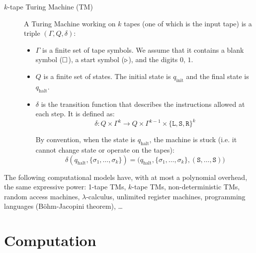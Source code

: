 \begin{description}
    \item[$k$-tape Turing Machine (TM)] 
        A Turing Machine working on $k$ tapes (one of which is the input tape) is a triple $(\Gamma, Q, \delta)$:
        \begin{itemize}
            \item $\Gamma$ is a finite set of tape symbols.
                We assume that it contains a blank symbol ($\square$), a start symbol ($\triangleright$),
                and the digits $0$, $1$.
            
            \item $Q$ is a finite set of states.
                The initial state is $q_\text{init}$ and the final state is $q_\text{halt}$.

            \item $\delta$ is the transition function that describes the instructions allowed at each step. 
                It is defined as:
                \[ \delta: Q \times \Gamma^k \rightarrow Q \times \Gamma^{k-1} \times \{ \texttt{L}, \texttt{S}, \texttt{R} \}^k \]

                By convention, when the state is $q_\text{halt}$, the machine is stuck (i.e. it cannot change state or operate on the tapes):
                \[ \delta(q_\text{halt}, \{ \sigma_1, \dots, \sigma_k \}) = \big( q_\text{halt}, \{ \sigma_1, \dots, \sigma_k \}, (\texttt{S}, \dots, \texttt{S}) \big) \]
        \end{itemize}
\end{description}

\begin{theorem}
    The following computational models have, with at most a polynomial overhead, the same expressive power:
    1-tape TMs, $k$-tape TMs, non-deterministic TMs, 
    random access machines, $\lambda$-calculus, unlimited register machines, programming languages (Böhm-Jacopini theorem), \dots
\end{theorem}



\section{Computation}

